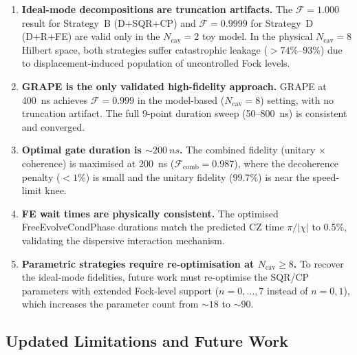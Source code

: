 \documentclass[aps,pra,twocolumn,reprint,floatfix,amsmath,amssymb]{revtex4-2}
\begin{document}
\begin{enumerate}
  \item \textbf{Ideal-mode decompositions are truncation artifacts.}
    The $\mathcal{F}=1.000$ result for Strategy~B (D+SQR+CP) and
    $\mathcal{F}=0.9999$ for Strategy~D (D+R+FE) are valid only in
    the $N_\mathrm{cav}=2$ toy model.  In the physical
    $N_\mathrm{cav}=8$ Hilbert space, both strategies suffer
    catastrophic leakage ($>74\%$--$93\%$) due to displacement-induced
    population of uncontrolled Fock levels.

  \item \textbf{GRAPE is the only validated high-fidelity approach.}
    GRAPE at \SI{400}{ns} achieves $\mathcal{F}=0.999$ in the
    model-based ($N_\mathrm{cav}=8$) setting, with no truncation
    artifact.  The full 9-point duration sweep
    (50--\SI{800}{ns}) is consistent and converged.

  \item \textbf{Optimal gate duration is $\sim\SI{200}{ns}$.}
    The combined fidelity (unitary $\times$ coherence) is maximised
    at \SI{200}{ns} ($\mathcal{F}_\mathrm{comb}=0.987$), where the
    decoherence penalty ($<1\%$) is small and the unitary fidelity
    ($99.7\%$) is near the speed-limit knee.

  \item \textbf{FE wait times are physically consistent.}
    The optimised FreeEvolveCondPhase durations match the predicted
    CZ time $\pi/|\chi|$ to $0.5\%$, validating the dispersive
    interaction mechanism.

  \item \textbf{Parametric strategies require re-optimisation at
    $N_\mathrm{cav}\geq 8$.}
    To recover the ideal-mode fidelities, future work must
    re-optimise the SQR/CP parameters with extended Fock-level
    support ($n=0,\ldots,7$ instead of $n=0,1$), which increases
    the parameter count from $\sim 18$ to $\sim 90$.
\end{enumerate}

\subsection{Updated Limitations and Future Work}
\end{document}
